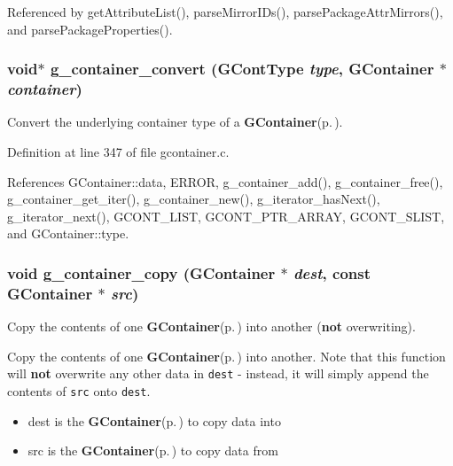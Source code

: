 Referenced by get\-Attribute\-List(), parse\-Mirror\-IDs(), parse\-Package\-Attr\-Mirrors(), and parse\-Package\-Properties().
\subsubsection{\setlength{\rightskip}{0pt plus 5cm}void$\ast$ g\_\-container\_\-convert ({\bf GCont\-Type} {\em type}, {\bf GContainer} $\ast$ {\em container})}\label{gcontainer_8c_a20}


Convert the underlying container type of a {\bf GContainer}{\rm (p.\,\pageref{structGContainer})}. 



Definition at line 347 of file gcontainer.c.

References GContainer::data, ERROR, g\_\-container\_\-add(), g\_\-container\_\-free(), g\_\-container\_\-get\_\-iter(), g\_\-container\_\-new(), g\_\-iterator\_\-has\-Next(), g\_\-iterator\_\-next(), GCONT\_\-LIST, GCONT\_\-PTR\_\-ARRAY, GCONT\_\-SLIST, and GContainer::type.
\subsubsection{\setlength{\rightskip}{0pt plus 5cm}void g\_\-container\_\-copy ({\bf GContainer} $\ast$ {\em dest}, const {\bf GContainer} $\ast$ {\em src})}\label{gcontainer_8c_a21}


Copy the contents of one {\bf GContainer}{\rm (p.\,\pageref{structGContainer})} into another ({\bf not} overwriting). 

Copy the contents of one {\bf GContainer}{\rm (p.\,\pageref{structGContainer})} into another. Note that this function will {\bf not} overwrite any other data in {\tt dest} - instead, it will simply append the contents of {\tt src} onto {\tt dest}.

\begin{itemize}
\item dest is the {\bf GContainer}{\rm (p.\,\pageref{structGContainer})} to copy data into \item src is the {\bf GContainer}{\rm (p.\,\pageref{structGContainer})} to copy data from \end{itemize}


